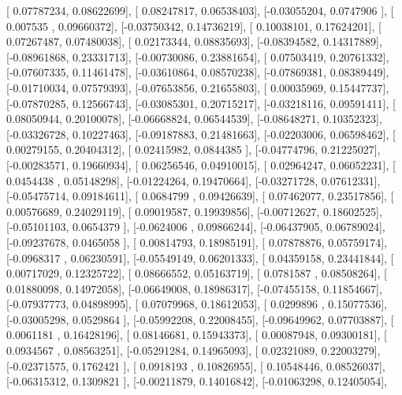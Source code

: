 \documentclass{article}
\begin{document}
       [ 0.07787234,  0.08622699],
       [ 0.08247817,  0.06538403],
       [-0.03055204,  0.0747906 ],
       [ 0.007535  ,  0.09660372],
       [-0.03750342,  0.14736219],
       [ 0.10038101,  0.17624201],
       [ 0.07267487,  0.07480038],
       [ 0.02173344,  0.08835693],
       [-0.08394582,  0.14317889],
       [-0.08961868,  0.23331713],
       [-0.00730086,  0.23881654],
       [ 0.07503419,  0.20761332],
       [-0.07607335,  0.11461478],
       [-0.03610864,  0.08570238],
       [-0.07869381,  0.08389449],
       [-0.01710034,  0.07579393],
       [-0.07653856,  0.21655803],
       [ 0.00035969,  0.15447737],
       [-0.07870285,  0.12566743],
       [-0.03085301,  0.20715217],
       [-0.03218116,  0.09591411],
       [ 0.08050944,  0.20100078],
       [-0.06668824,  0.06544539],
       [-0.08648271,  0.10352323],
       [-0.03326728,  0.10227463],
       [-0.09187883,  0.21481663],
       [-0.02203006,  0.06598462],
       [ 0.00279155,  0.20404312],
       [ 0.02415982,  0.0844385 ],
       [-0.04774796,  0.21225027],
       [-0.00283571,  0.19660934],
       [ 0.06256546,  0.04910015],
       [ 0.02964247,  0.06052231],
       [ 0.0454438 ,  0.05148298],
       [-0.01224264,  0.19470664],
       [-0.03271728,  0.07612331],
       [-0.05475714,  0.09184611],
       [ 0.0684799 ,  0.09426639],
       [ 0.07462077,  0.23517856],
       [ 0.00576689,  0.24029119],
       [ 0.09019587,  0.19939856],
       [-0.00712627,  0.18602525],
       [-0.05101103,  0.0654379 ],
       [-0.0624006 ,  0.09866244],
       [-0.06437905,  0.06789024],
       [-0.09237678,  0.0465058 ],
       [ 0.00814793,  0.18985191],
       [ 0.07878876,  0.05759174],
       [-0.0968317 ,  0.06230591],
       [-0.05549149,  0.06201333],
       [ 0.04359158,  0.23441844],
       [ 0.00717029,  0.12325722],
       [ 0.08666552,  0.05163719],
       [ 0.0781587 ,  0.08508264],
       [ 0.01880098,  0.14972058],
       [-0.06649008,  0.18986317],
       [-0.07455158,  0.11854667],
       [-0.07937773,  0.04898995],
       [ 0.07079968,  0.18612053],
       [ 0.0299896 ,  0.15077536],
       [-0.03005298,  0.0529864 ],
       [-0.05992208,  0.22008455],
       [-0.09649962,  0.07703887],
       [ 0.0061181 ,  0.16428196],
       [ 0.08146681,  0.15943373],
       [ 0.00087948,  0.09300181],
       [ 0.0934567 ,  0.08563251],
       [-0.05291284,  0.14965093],
       [ 0.02321089,  0.22003279],
       [-0.02371575,  0.1762421 ],
       [ 0.0918193 ,  0.10826955],
       [ 0.10548446,  0.08526037],
       [-0.06315312,  0.1309821 ],
       [-0.00211879,  0.14016842],
       [-0.01063298,  0.12405054],
\end{document}
